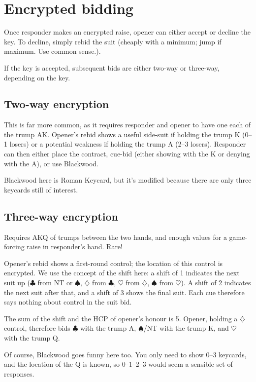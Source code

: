 \documentclass[a4paper,12pt]{article}
\begin{document}
\section{Encrypted bidding}

Once responder makes an encrypted raise, opener can either accept or decline
the key.  To decline, simply rebid the suit (cheaply with a minimum; jump if
maximum.  Use common sense.).

If the key is accepted, subsequent bids are either two-way or three-way, depending on the key.

\subsection{Two-way encryption}

This is far more common, as it requires responder and opener to have one each
of the trump AK. Opener's rebid shows a useful side-suit if holding the trump
K (0--1 losers) or a potential weakness if holding the trump A (2--3 losers).
Responder can then either place the contract, cue-bid (either showing with the
K or denying with the A), or use Blackwood.

Blackwood here is Roman Keycard, but it's modified because there are only three keycards
still of interest.

\subsection{Three-way encryption}

Requires AKQ of trumps between the two hands, and enough values for a
game-forcing raise in responder's hand.  Rare!

Opener's rebid shows a first-round control; the location of this control is
encrypted.  We use the concept of the shift here: a shift of 1 indicates the
next suit up ($\clubsuit$ from NT or $\spadesuit$, $\diamondsuit$ from $\clubsuit$, $\heartsuit$ from $\diamondsuit$, $\spadesuit$ from $\heartsuit$).  A shift of 2
indicates the next suit after that, and a shift of 3 shows the final suit.
Each cue therefore says nothing about control in the suit bid.

The sum of the shift and the HCP of opener's honour is 5.  Opener, holding a $\diamondsuit$
control, therefore bids $\clubsuit$ with the trump A, $\spadesuit$/NT with the trump K, and $\heartsuit$ with
the trump Q.

Of course, Blackwood goes funny here too.  You only need to show 0--3 keycards,
and the location of the Q is known, so 0--1--2--3 would seem a sensible set
of responses.
\end{document}
